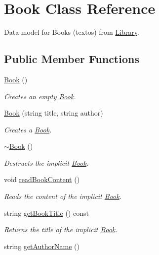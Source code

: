 \hypertarget{class_book}{}\section{Book Class Reference}
\label{class_book}


Data model for Books (textos) from \hyperlink{class_library}{Library}.  


\subsection*{Public Member Functions}
\begin{DoxyCompactItemize}
\item 
\hyperlink{class_book_a2eac9e235a08763158f78533f7a83e1f}{Book} ()
\begin{DoxyCompactList}\small\item\em Creates an empty \hyperlink{class_book}{Book}. \end{DoxyCompactList}\item 
\hyperlink{class_book_a98dad89c9f945e0d846c81ce7e459fbc}{Book} (string title, string author)
\begin{DoxyCompactList}\small\item\em Creates a \hyperlink{class_book}{Book}. \end{DoxyCompactList}\item 
\hyperlink{class_book_a0ba8eceb34ea1301bc08942e37824767}{$\sim$\+Book} ()
\begin{DoxyCompactList}\small\item\em Destructs the implicit \hyperlink{class_book}{Book}. \end{DoxyCompactList}\item 
void \hyperlink{class_book_a3e62d70f19bf6fa8ebef5556882b3ed7}{read\+Book\+Content} ()
\begin{DoxyCompactList}\small\item\em Reads the content of the implicit \hyperlink{class_book}{Book}. \end{DoxyCompactList}\item 
string \hyperlink{class_book_aae6e165b712f111beb53574cd2f53776}{get\+Book\+Title} () const 
\begin{DoxyCompactList}\small\item\em Returns the title of the implicit \hyperlink{class_book}{Book}. \end{DoxyCompactList}\item 
string \hyperlink{class_book_a651503f226fbf2c9c050f9527a3b983e}{get\+Author\+Name} ()

\end{DoxyCompactItemize}
